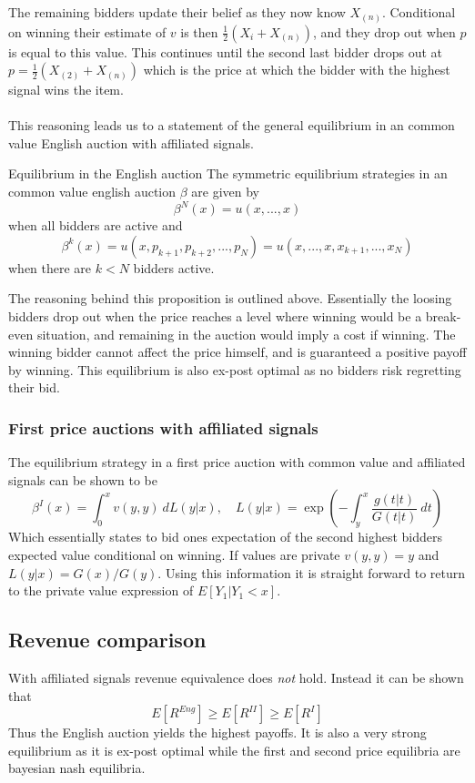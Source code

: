 The remaining bidders update their belief as they now know $X_{(n)}$. Conditional on winning their estimate of $v$ is then $\frac{1}{2}(X_i + X_{(n)})$, and they drop out when $p$ is equal to this value. This continues until the second last bidder drops out at $p=\frac{1}{2}(X_{(2)} + X_{(n)})$ which is the price at which the bidder with the highest signal wins the item.
\\ \\
This reasoning leads us to a statement of the general equilibrium in an common value English auction with affiliated signals. 
\begin{proposition}{Equilibrium in the English auction}
The symmetric equilibrium strategies in an common value english auction $\beta$ are given by
\begin{equation}
  \beta^N(x) = u(x,...,x)
\end{equation}
when all bidders are active and 
\begin{equation}
  \beta^{k}(x) = u(x, p_{k+1}, p_{k+2}, ..., p_N) = u(x, ...,x, x_{k+1}, ..., x_{N})
\end{equation}
when there are $k<N$ bidders active.
\end{proposition}
The reasoning behind this proposition is outlined above. Essentially the loosing bidders drop out when the price reaches a level where winning would be a break-even situation, and remaining in the auction would imply a cost if winning. The winning bidder cannot affect the price himself, and is guaranteed a positive payoff by winning. This equilibrium is also ex-post optimal as no bidders risk regretting their bid.

\subsubsection{First price auctions with affiliated signals}
The equilibrium strategy in a first price auction with common value and affiliated signals can be shown to be 
\begin{equation}
  \beta^I(x) = \int_0^x v(y,y) \ d L(y|x), \quad L(y|x)=\exp\left(
      - \int_y^x \frac{g(t|t)}{G(t|t)} \ dt
    \right)
\end{equation}
Which essentially states to bid ones expectation of the second highest bidders expected value conditional on winning. If values are private $v(y,y)=y$ and $L(y|x) = G(x)/G(y)$. Using this information it is straight forward to return to the private value expression of $E[Y_1|Y_1 < x]$.

\subsection{Revenue comparison}
With affiliated signals revenue equivalence does \textit{not} hold. Instead it can be shown that 
\begin{equation}
  E[R^{Eng}] \geq E[R^{II}] \geq E[R^I]
\end{equation}
Thus the English auction yields the highest payoffs. It is also a very strong equilibrium as it is ex-post optimal while the first and second price equilibria are bayesian nash equilibria.

